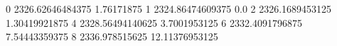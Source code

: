 0 2326.62646484375 1.76171875
1 2324.86474609375 0.0
2 2326.1689453125 1.30419921875
4 2328.56494140625 3.7001953125
6 2332.4091796875 7.54443359375
8 2336.978515625 12.11376953125
